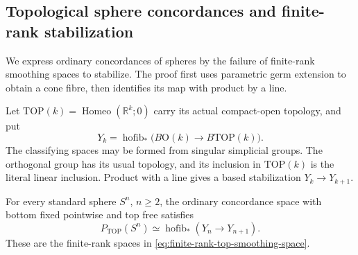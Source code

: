 \subsection{Topological sphere concordances and finite-rank stabilization}
We express ordinary concordances of spheres by the failure of
finite-rank smoothing spaces to stabilize. The proof first uses
parametric germ extension to obtain a cone fibre, then identifies
its map with product by a line.


Let $\mathrm{TOP}(k)=\operatorname{Homeo}(\mathbb R^k;0)$ carry its
actual compact-open topology, and put
\begin{equation}\label{eq:finite-rank-top-smoothing-space}
 Y_k=\operatorname{hofib}_{*}
       \bigl(B\mathrm O(k)\longrightarrow B\mathrm{TOP}(k)\bigr).
\end{equation}
The classifying spaces may be formed from singular simplicial groups.
The orthogonal group has its usual topology, and its inclusion in
$\mathrm{TOP}(k)$ is the literal linear inclusion.  Product with a
line gives a based stabilization $Y_k\to Y_{k+1}$.

\begin{theorem}\label{thm:top-sphere-finite-rank-stabilization}
For every standard sphere $S^n$, $n\geq2$, the ordinary concordance
space with bottom fixed pointwise and top free satisfies
\begin{equation}\label{eq:top-sphere-concordance-fibre}
 P_{\mathrm{TOP}}(S^n)\simeq
       \operatorname{hofib}_{*}(Y_n\longrightarrow Y_{n+1}).
\end{equation}
These are the finite-rank spaces in
\eqref{eq:finite-rank-top-smoothing-space}.
\end{theorem}

